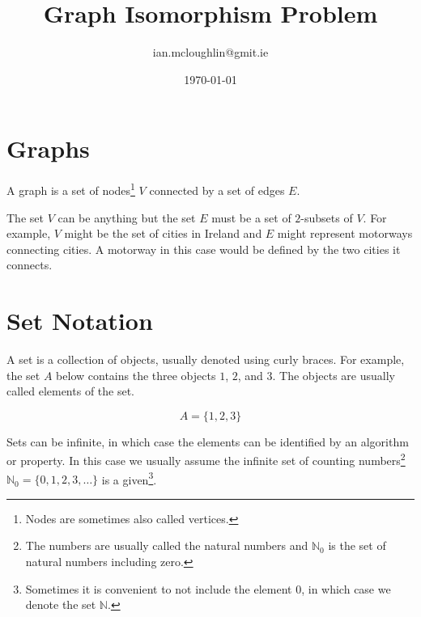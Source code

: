 \documentclass{notes}
\title{Graph Isomorphism Problem}
\author{ian.mcloughlin@gmit.ie}
\date{\today}
\begin{document}
\section{Graphs}
  
  A graph\autocite[10]{sipser} is a set of nodes\footnote{Nodes are sometimes also called vertices.} $V$ connected by a set of edges $E$.

  \begin{figure}
    \center
    \end{figure}

  The set $V$ can be anything but the set $E$ must be a set of $2$-subsets of $V$.
  For example, $V$ might be the set of cities in Ireland and $E$ might represent motorways connecting cities.
  A motorway in this case would be defined by the two cities it connects.

\section{Set Notation}
  A set is a collection of objects, usually denoted using curly braces\autocite[3]{sipser}.
  For example, the set $A$ below contains the three objects $1$, $2$, and $3$.
  The objects are usually called elements of the set.

  $$ A = \{ 1, 2, 3 \} $$

  Sets can be infinite, in which case the elements can be identified by an algorithm or property.
  In this case we usually assume the infinite set of counting numbers\footnote{The numbers are usually called the natural numbers and $\mathbb{N}_0$ is the set of natural numbers including zero.} $\mathbb{N}_0 = \{ 0, 1, 2, 3, \ldots \}$ is a given\footnote{Sometimes it is convenient to not include the element $0$, in which case we denote the set $\mathbb{N}$.}.
\end{document}
